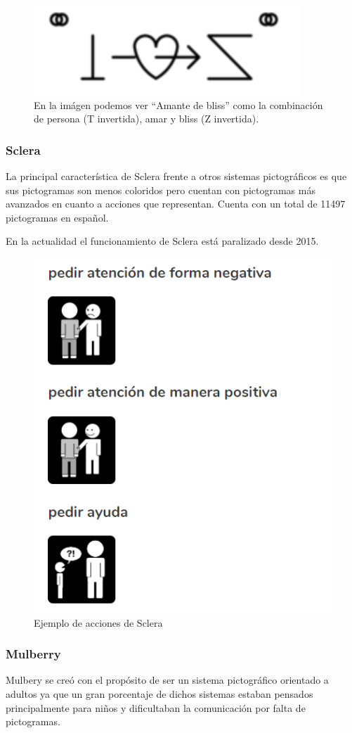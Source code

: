 \begin{figure}[h!]
	\centering
	\includegraphics[width=0.3\linewidth]{Imagenes/Bitmap/Blissymbolics}
	\caption{En la imágen podemos ver “Amante de bliss” como la combinación de persona (T invertida), amar y bliss (Z invertida).}
	\label{fig:blissymbolics}
\end{figure}


\subsubsection{Sclera}
La principal característica de Sclera frente a otros sistemas pictográficos es que sus pictogramas son menos coloridos pero cuentan con pictogramas más avanzados en cuanto a acciones que representan. Cuenta con un total de 11497 pictogramas en español.

En la actualidad el funcionamiento de Sclera está paralizado desde 2015.

\begin{figure}[h!]
	\centering
	\includegraphics[width=0.7\linewidth]{Imagenes/Bitmap/Sclera}
	\caption{Ejemplo de acciones de Sclera}
	\label{fig:sclera}
\end{figure}

\subsubsection{Mulberry}
Mulbery se creó con el propósito de ser un sistema pictográfico orientado a adultos ya que un gran porcentaje de dichos sistemas estaban pensados principalmente para niños y dificultaban la comunicación por falta de pictogramas.

